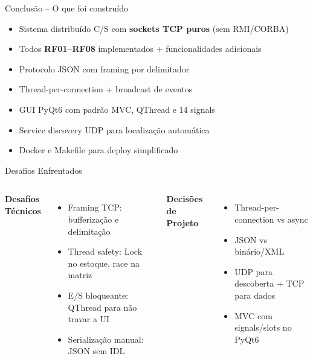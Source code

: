 \documentclass[aspectratio=169]{beamer}
\begin{document}
\begin{frame}{Conclus\~ao -- O que foi constru\'ido}
  \begin{itemize}
    \item Sistema distribu\'ido C/S com \textbf{sockets TCP puros} (sem RMI/CORBA)
    \item Todos \textbf{RF01--RF08} implementados + funcionalidades adicionais
    \item Protocolo JSON com framing por delimitador
    \item Thread-per-connection + broadcast de eventos
    \item GUI PyQt6 com padr\~ao MVC, QThread e 14 signals
    \item Service discovery UDP para localiza\c{c}\~ao autom\'atica
    \item Docker e Makefile para deploy simplificado
  \end{itemize}
\end{frame}

\begin{frame}{Desafios Enfrentados}
  \begin{columns}
    \textbf{Desafios T\'ecnicos}
    \begin{itemize}
      \item Framing TCP: bufferiza\c{c}\~ao e delimita\c{c}\~ao
      \item Thread safety: Lock no estoque, race na matriz
      \item E/S bloqueante: QThread para n\~ao travar a UI
      \item Serializa\c{c}\~ao manual: JSON sem IDL
    \end{itemize}
    \textbf{Decis\~oes de Projeto}
    \begin{itemize}
      \item Thread-per-connection vs async
      \item JSON vs bin\'ario/XML
      \item UDP para descoberta + TCP para dados
      \item MVC com signals/slots no PyQt6
    \end{itemize}
  \end{columns}
\end{frame}
\end{document}
